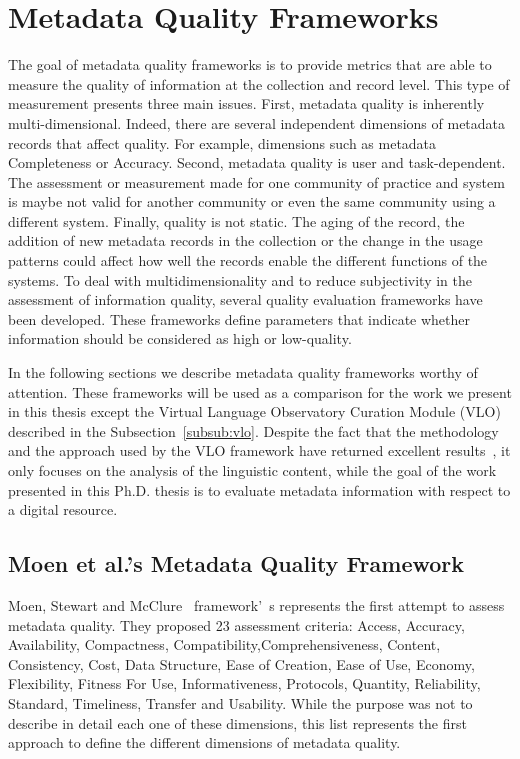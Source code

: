 \documentclass[epsfig,a4paper,12pt,titlepage]{book}
\begin{document}
\section{Metadata Quality Frameworks}
\label{sec:metadata_framework}
The goal of metadata quality frameworks is to provide metrics that are able to measure the quality of information at the collection and record level. This type of measurement presents three main issues. First, metadata quality is inherently multi-dimensional. Indeed, there are several independent dimensions of metadata records that affect quality. For example, dimensions such as  metadata Completeness or Accuracy. Second, metadata quality is user and task-dependent. The assessment or measurement made for one community of practice and system is maybe not valid for another community or even the same community using a different system. Finally, quality is not static. The aging of the record, the addition of new metadata records in the collection or the change in the usage patterns could affect how well the records enable the different functions of the systems. To deal with multidimensionality and to reduce subjectivity in the assessment of information quality, several quality evaluation frameworks have been developed. These frameworks define parameters that indicate whether information should be considered as high or low-quality. 

In the following sections we describe metadata quality frameworks worthy of attention. These frameworks will be used as a comparison for the work we present in this thesis except the Virtual Language Observatory Curation Module (VLO)~\cite{Ostojic2017} described in the Subsection~\ref{subsub:vlo}. Despite the fact that the methodology and the approach used by the VLO framework have  returned excellent results~\cite{Sugimoto2017}, it only focuses on the analysis of the linguistic content, while the goal of the work presented in this Ph.D. thesis is to evaluate metadata information with respect to a digital resource. 

\subsection{Moen et al.'s Metadata Quality Framework}
\label{sub:moen}
 Moen, Stewart and McClure~\cite{moen1998assessing} framework'\ s represents the first attempt to assess metadata quality. They proposed 23 assessment criteria: Access, Accuracy, Availability, Compactness, Compatibility,Comprehensiveness, Content, Consistency, Cost, Data Structure, Ease of Creation, Ease of Use, Economy, Flexibility, Fitness For Use, Informativeness, Protocols, Quantity, Reliability, Standard, Timeliness, Transfer and Usability. While the purpose  was not to describe in detail each one of these dimensions, this list represents the first approach to define the different dimensions of metadata quality.
\end{document}
